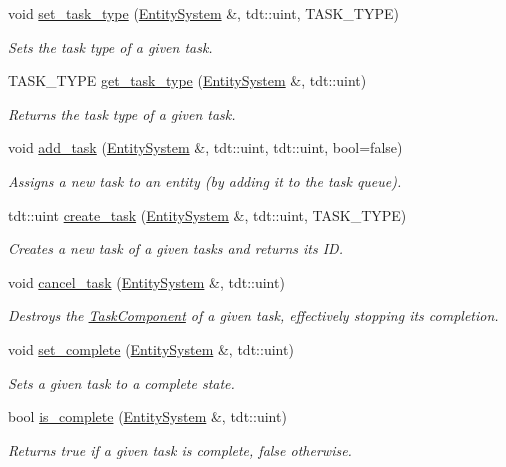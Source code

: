 \begin{DoxyCompactItemize}
void \hyperlink{namespace_task_helper_a7b6370ffed365f7f00155c06cfbbaa2e}{set\+\_\+task\+\_\+type} (\hyperlink{class_entity_system}{Entity\+System} \&, tdt\+::uint, T\+A\+S\+K\+\_\+\+T\+Y\+PE)
\begin{DoxyCompactList}\small\item\em Sets the task type of a given task. \end{DoxyCompactList}\item 
T\+A\+S\+K\+\_\+\+T\+Y\+PE \hyperlink{namespace_task_helper_ac40ff99019779d11c1becd0009891f62}{get\+\_\+task\+\_\+type} (\hyperlink{class_entity_system}{Entity\+System} \&, tdt\+::uint)
\begin{DoxyCompactList}\small\item\em Returns the task type of a given task. \end{DoxyCompactList}\item 
void \hyperlink{namespace_task_helper_ae32abfa26c5e3e8b53c6e1f530e3fdad}{add\+\_\+task} (\hyperlink{class_entity_system}{Entity\+System} \&, tdt\+::uint, tdt\+::uint, bool=false)
\begin{DoxyCompactList}\small\item\em Assigns a new task to an entity (by adding it to the task queue). \end{DoxyCompactList}\item 
tdt\+::uint \hyperlink{namespace_task_helper_aa3ff7153b8be6844005082386b79dde8}{create\+\_\+task} (\hyperlink{class_entity_system}{Entity\+System} \&, tdt\+::uint, T\+A\+S\+K\+\_\+\+T\+Y\+PE)
\begin{DoxyCompactList}\small\item\em Creates a new task of a given tasks and returns it\textquotesingle{}s ID. \end{DoxyCompactList}\item 
void \hyperlink{namespace_task_helper_a2a21380371965b780ba793efa3c3f9dc}{cancel\+\_\+task} (\hyperlink{class_entity_system}{Entity\+System} \&, tdt\+::uint)
\begin{DoxyCompactList}\small\item\em Destroys the \hyperlink{struct_task_component}{Task\+Component} of a given task, effectively stopping it\textquotesingle{}s completion. \end{DoxyCompactList}\item 
void \hyperlink{namespace_task_helper_aab5c9d2062de438218c9368099a27c5e}{set\+\_\+complete} (\hyperlink{class_entity_system}{Entity\+System} \&, tdt\+::uint)
\begin{DoxyCompactList}\small\item\em Sets a given task to a complete state. \end{DoxyCompactList}\item 
bool \hyperlink{namespace_task_helper_acb1489d11c9931bc0feb3657be592f51}{is\+\_\+complete} (\hyperlink{class_entity_system}{Entity\+System} \&, tdt\+::uint)
\begin{DoxyCompactList}\small\item\em Returns true if a given task is complete, false otherwise. \end{DoxyCompactList}\end{DoxyCompactItemize}


